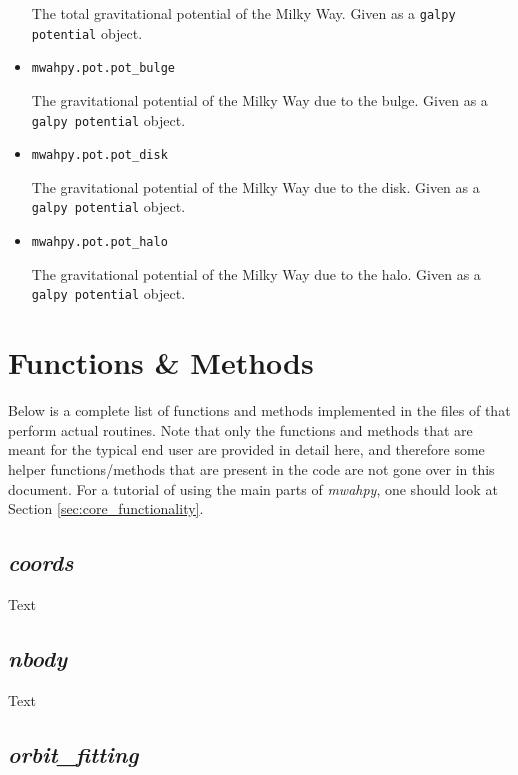 \documentclass{article}
\begin{document}
\begin{itemize}
The total gravitational potential of the Milky Way. Given as a \verb!galpy potential! object. 

\item \verb!mwahpy.pot.pot_bulge!

The gravitational potential of the Milky Way due to the bulge. Given as a \verb!galpy potential! object. 

\item \verb!mwahpy.pot.pot_disk!

The gravitational potential of the Milky Way due to the disk. Given as a \verb!galpy potential! object. 

\item \verb!mwahpy.pot.pot_halo!

The gravitational potential of the Milky Way due to the halo. Given as a \verb!galpy potential! object. 

\end{itemize}

\newpage

\section{Functions \& Methods}

Below is a complete list of functions and methods implemented in the files of \mwahpy that perform actual routines. Note that only the functions and methods that are meant for the typical end user are provided in detail here, and therefore some helper functions/methods that are present in the code are not gone over in this document. For a tutorial of using the main parts of \textit{mwahpy}, one should look at Section \ref{sec:core_functionality}. 

\subsection{\textit{coords}} \label{sec:doc_coords}

Text

\subsection{\textit{nbody}}

Text

\subsection{\textit{orbit\_fitting}}
\end{document}
